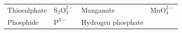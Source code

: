 {\begin{center}
\begin{xtabular*}{\mytablewidth}[t]{|p{10\mystarwidth}|p{10\mystarwidth}|p{10\mystarwidth}|p{10\mystarwidth}|}
    
        Thiosulphate &
    
    
        \begin{math}{\mathrm{S}}_{2}\mathrm{O}_{3}^{2-}\end{math} &
    
    
        Manganate &
    
    
        \begin{math}\mathrm{MnO}_{4}^{2-}\end{math}%
     \tabularnewline{}
    
    
        Phosphide &
    
    
        \begin{math}{\mathrm{P}}^{3-}\end{math} &
    
    
        Hydrogen phosphate &
    
    

\end{xtabular*}
\end{center}}
